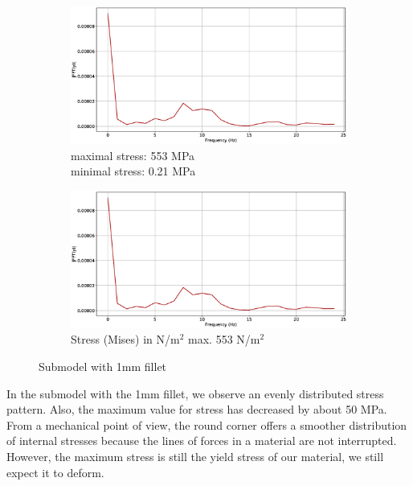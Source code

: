 \documentclass[12pt]{article}
\begin{document}
\begin{figure}[!htb]
  \centering
  \begin{subfigure}{.5\textwidth}
    \centering
    \includegraphics[width=0.95\linewidth]{pics/vib_fourier}
    \caption{maximal stress: 553 MPa \\\hspace{\textwidth}minimal stress: 0.21 MPa}
  \end{subfigure}%
  \begin{subfigure}{.5\textwidth}
    \centering
    \includegraphics[width=0.95\linewidth]{pics/vib_fourier}
    \caption{Stress (Mises) in N/m$^{2}$ max. 553 N/m$^{2}$}
   \end{subfigure}
  \caption{Submodel with 1mm fillet}
\end{figure}

In the submodel with the 1mm fillet, we observe an evenly distributed stress pattern. Also,
the maximum value for stress has decreased by about 50 MPa. From a mechanical point of view, 
the round corner offers a smoother distribution of internal stresses because the lines of 
forces in a material are not interrupted. However, the maximum stress is still the yield 
stress of our material, we still expect it to deform.
\pagebreak
\end{document}
